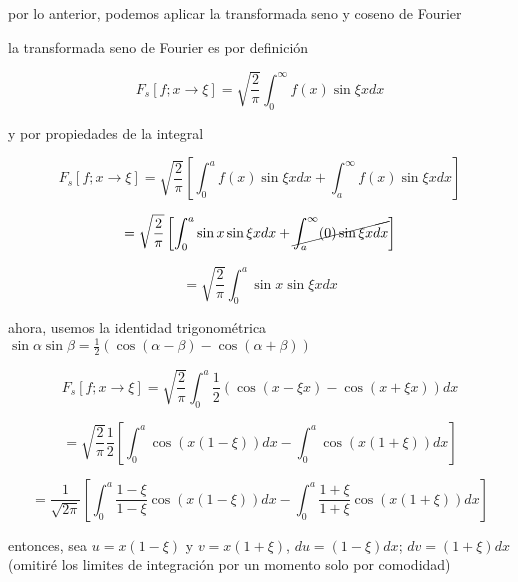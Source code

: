 \documentclass[12pt,a4paper]{article}
\begin{document}
\begin{enumerate}
    por lo anterior, podemos aplicar la transformada seno y coseno de Fourier
    
    la transformada seno de Fourier es por definición
    
    \begin{equation*}
        F_s[f;x \rightarrow \xi] = \sqrt{\frac{2}{\pi}}\int_{0}^{\infty} f(x)\sin{\xi x} dx
    \end{equation*}
    
    y por propiedades de la integral
    
    \begin{equation*}
        F_s[f;x \rightarrow \xi] = \sqrt{\frac{2}{\pi}}\left[\int_{0}^{a} f(x)\sin{\xi x} dx + \int_{a}^{\infty} f(x) \sin{\xi x} dx\right]
    \end{equation*}
    
    \begin{equation*}
        = \sqrt{\frac{2}{\pi}}\left[\int_{0}^{a} \sin{x}\sin{\xi x} dx + \cancel{\int_{a}^{\infty} (0) \sin{\xi x} dx}\right]
    \end{equation*}
    
    \begin{equation*}
        =\sqrt{\frac{2}{\pi}}\int_{0}^{a} \sin{x}\sin{\xi x} dx
    \end{equation*}
    
    ahora, usemos la identidad trigonométrica $\sin{\alpha} \sin{\beta}= \frac{1}{2}(\cos{(\alpha - \beta)}-\cos{(\alpha+\beta)})$
    
    \begin{equation*}
        F_s[f;x \rightarrow \xi] =\sqrt{\frac{2}{\pi}}\int_{0}^{a} \frac{1}{2}(\cos{(x- \xi x)} - \cos{(x+\xi x)}) dx
    \end{equation*}
    
    \begin{equation*}
        =\sqrt{\frac{2}{\pi}}\frac{1}{2}\left[\int_{0}^{a}\cos{(x(1- \xi))}  dx - \int_{0}^{a} \cos{(x(1+\xi))} dx \right]
    \end{equation*}
    
    \begin{equation*}
        =\frac{1}{\sqrt{2\pi}}\left[\int_{0}^{a}\frac{1-\xi}{1-\xi}\cos{(x(1- \xi))}  dx - \int_{0}^{a}\frac{1+\xi}{1+\xi} \cos{(x(1+\xi))} dx \right]
    \end{equation*}
    
    entonces, sea $u=x(1-\xi)$ y $v=x(1+\xi)$, $du=(1-\xi)dx$; $dv=(1+\xi)dx$(omitiré los limites de integración por un momento solo por comodidad)
    

\end{enumerate}
\end{document}
